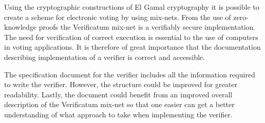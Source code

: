 Using the cryptographic constructions of El Gamal cryptography it is
possible to create a scheme for electronic voting by using
mix-nets. From the use of zero-knowledge proofs the Verificatum
mix-net is a verifiably secure implementation. The need for
verification of correct execution is essential to the use of computers
in voting applications. It is therefore of great importance that the
documentation describing implementation of a verifier is correct and
accessible.

The specification document for the verifier includes all the
information required to write the verifier. However, the structure
could be improved for greater readability. Lastly, the document could
benefit from an improved overall description of the Verificatum
mix-net so that one easier can get a better understanding of what
approach to take when implementing the verifier.

\vspace{16pt}
